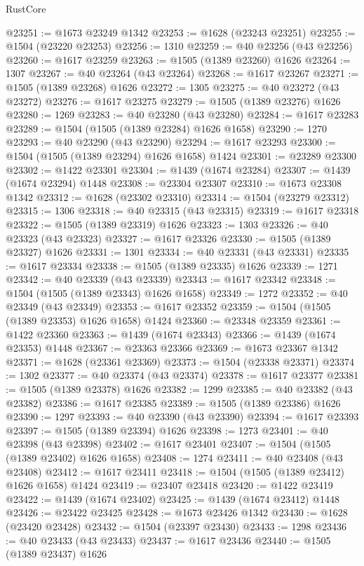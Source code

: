 \begin{lexlean}{RustCore}
\begin{coremodule}
@23251 := @1673 @23249 @1342
@23253 := @1628 (@23243 @23251)
@23255 := @1504 (@23220 @23253)
@23256 := 1310
@23259 := @40 @23256 (@43 @23256)
@23260 := @1617 @23259
@23263 := @1505 (@1389 @23260) @1626
@23264 := 1307
@23267 := @40 @23264 (@43 @23264)
@23268 := @1617 @23267
@23271 := @1505 (@1389 @23268) @1626
@23272 := 1305
@23275 := @40 @23272 (@43 @23272)
@23276 := @1617 @23275
@23279 := @1505 (@1389 @23276) @1626
@23280 := 1269
@23283 := @40 @23280 (@43 @23280)
@23284 := @1617 @23283
@23289 := @1504 (@1505 (@1389 @23284) @1626 @1658)
@23290 := 1270
@23293 := @40 @23290 (@43 @23290)
@23294 := @1617 @23293
@23300 := @1504 (@1505 (@1389 @23294) @1626 @1658) @1424
@23301 := @23289 @23300
@23302 := @1422 @23301
@23304 := @1439 (@1674 @23284)
@23307 := @1439 (@1674 @23294) @1448
@23308 := @23304 @23307
@23310 := @1673 @23308 @1342
@23312 := @1628 (@23302 @23310)
@23314 := @1504 (@23279 @23312)
@23315 := 1306
@23318 := @40 @23315 (@43 @23315)
@23319 := @1617 @23318
@23322 := @1505 (@1389 @23319) @1626
@23323 := 1303
@23326 := @40 @23323 (@43 @23323)
@23327 := @1617 @23326
@23330 := @1505 (@1389 @23327) @1626
@23331 := 1301
@23334 := @40 @23331 (@43 @23331)
@23335 := @1617 @23334
@23338 := @1505 (@1389 @23335) @1626
@23339 := 1271
@23342 := @40 @23339 (@43 @23339)
@23343 := @1617 @23342
@23348 := @1504 (@1505 (@1389 @23343) @1626 @1658)
@23349 := 1272
@23352 := @40 @23349 (@43 @23349)
@23353 := @1617 @23352
@23359 := @1504 (@1505 (@1389 @23353) @1626 @1658) @1424
@23360 := @23348 @23359
@23361 := @1422 @23360
@23363 := @1439 (@1674 @23343)
@23366 := @1439 (@1674 @23353) @1448
@23367 := @23363 @23366
@23369 := @1673 @23367 @1342
@23371 := @1628 (@23361 @23369)
@23373 := @1504 (@23338 @23371)
@23374 := 1302
@23377 := @40 @23374 (@43 @23374)
@23378 := @1617 @23377
@23381 := @1505 (@1389 @23378) @1626
@23382 := 1299
@23385 := @40 @23382 (@43 @23382)
@23386 := @1617 @23385
@23389 := @1505 (@1389 @23386) @1626
@23390 := 1297
@23393 := @40 @23390 (@43 @23390)
@23394 := @1617 @23393
@23397 := @1505 (@1389 @23394) @1626
@23398 := 1273
@23401 := @40 @23398 (@43 @23398)
@23402 := @1617 @23401
@23407 := @1504 (@1505 (@1389 @23402) @1626 @1658)
@23408 := 1274
@23411 := @40 @23408 (@43 @23408)
@23412 := @1617 @23411
@23418 := @1504 (@1505 (@1389 @23412) @1626 @1658) @1424
@23419 := @23407 @23418
@23420 := @1422 @23419
@23422 := @1439 (@1674 @23402)
@23425 := @1439 (@1674 @23412) @1448
@23426 := @23422 @23425
@23428 := @1673 @23426 @1342
@23430 := @1628 (@23420 @23428)
@23432 := @1504 (@23397 @23430)
@23433 := 1298
@23436 := @40 @23433 (@43 @23433)
@23437 := @1617 @23436
@23440 := @1505 (@1389 @23437) @1626

\end{coremodule}
\end{lexlean}
